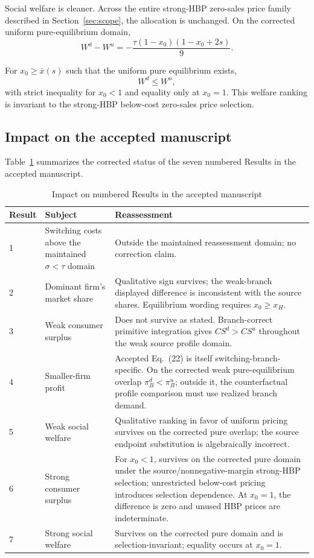 Social welfare is cleaner. Across the entire strong-HBP zero-sales price family described in Section~\ref{sec:scope}, the allocation is unchanged. On the corrected uniform pure-equilibrium domain,
\begin{equation}
W^d-W^u
=
-\frac{\tau(1-x_0)(1-x_0+2s)}9.
\label{eq:strong-welfare}
\end{equation}

\begin{proposition}
\label{prop:strong-welfare}
For \(x_0\ge\bar x(s)\) such that the uniform pure equilibrium exists,
\[
W^d\le W^u,
\]
with strict inequality for \(x_0<1\) and equality only at \(x_0=1\). This welfare ranking is invariant to the strong-HBP below-cost zero-sales price selection.
\end{proposition}

\subsection{Impact on the accepted manuscript}

Table~\ref{tab:result-map} summarizes the corrected status of the seven numbered Results in the accepted manuscript.

\begin{table}[t]
\centering
\caption{Impact on numbered Results in the accepted manuscript}
\label{tab:result-map}
\small
\begin{tabular}{p{}p{}p{}}
\toprule
Result & Subject & Reassessment\\
\midrule
1 & Switching costs above the maintained \(\sigma<\tau\) domain & Outside the maintained reassessment domain; no correction claim. \\
2 & Dominant firm's market share & Qualitative sign survives; the weak-branch displayed difference is inconsistent with the source shares. Equilibrium wording requires \(x_0\ge x_H\). \\
3 & Weak consumer surplus & Does not survive as stated. Branch-correct primitive integration gives \(CS^d>CS^u\) throughout the weak source profile domain. \\
4 & Smaller-firm profit & Accepted Eq.~(22) is itself switching-branch-specific. On the corrected weak pure-equilibrium overlap \(\pi_B^d<\pi_B^u\); outside it, the counterfactual profile comparison must use realized branch demand. \\
5 & Weak social welfare & Qualitative ranking in favor of uniform pricing survives on the corrected pure overlap; the source endpoint substitution is algebraically incorrect. \\
6 & Strong consumer surplus & For \(x_0<1\), survives on the corrected pure domain under the source/nonnegative-margin strong-HBP selection; unrestricted below-cost pricing introduces selection dependence. At \(x_0=1\), the difference is zero and unused HBP prices are indeterminate. \\
7 & Strong social welfare & Survives on the corrected pure domain and is selection-invariant; equality occurs at \(x_0=1\). \\
\bottomrule
\end{tabular}
\end{table}

